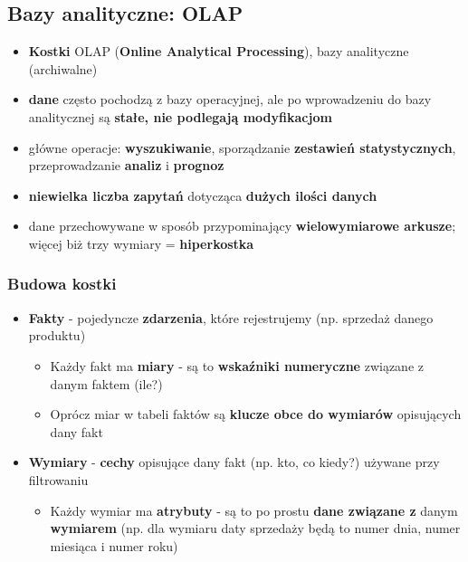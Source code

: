 \documentclass[a4paper]{article}
\begin{document}
    \subsection{Bazy analityczne: OLAP}
    \begin{itemize}
        \item \textbf{Kostki} OLAP (\textbf{Online Analytical Processing}), bazy analityczne (archiwalne)
        \item \textbf{dane} często pochodzą z bazy operacyjnej, ale po wprowadzeniu do bazy
        analitycznej są \textbf{stałe, nie podlegają modyfikacjom}
        \item główne operacje: \textbf{wyszukiwanie}, sporządzanie \textbf{zestawień statystycznych}, przeprowadzanie
        \textbf{analiz} i \textbf{prognoz}
        \item \textbf{niewielka liczba zapytań} dotycząca \textbf{dużych ilości danych}
        \item dane przechowywane w sposób przypominający \textbf{wielowymiarowe arkusze}; więcej biż trzy wymiary = \textbf{hiperkostka}
    \end{itemize}

    \subsubsection{Budowa kostki}
    \begin{itemize}
        \item \textbf{Fakty} - pojedyncze \textbf{zdarzenia}, które rejestrujemy (np. sprzedaż danego produktu)
        \begin{itemize}
            \item Każdy fakt ma \textbf{miary} - są to \textbf{wskaźniki numeryczne} związane z danym faktem (ile?)
            \item Oprócz miar w tabeli faktów są \textbf{klucze obce do wymiarów} opisujących dany fakt
        \end{itemize}
        \item \textbf{Wymiary} - \textbf{cechy} opisujące dany fakt (np. kto, co kiedy?) używane przy filtrowaniu
        \begin{itemize}
            \item Każdy wymiar ma \textbf{atrybuty} - są to po prostu \textbf{dane związane z} danym \textbf{wymiarem} (np. dla wymiaru daty sprzedaży będą to numer dnia, numer miesiąca i numer roku)
        \end{itemize}
    \end{itemize}
\end{document}
